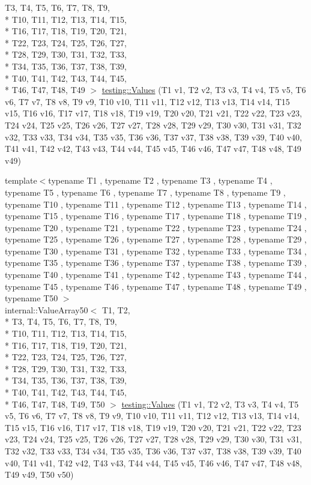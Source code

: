 \begin{DoxyCompactItemize}
T3, T4, T5, T6, T7, T8, T9, \\*
T10, T11, T12, T13, T14, T15, \\*
T16, T17, T18, T19, T20, T21, \\*
T22, T23, T24, T25, T26, T27, \\*
T28, T29, T30, T31, T32, T33, \\*
T34, T35, T36, T37, T38, T39, \\*
T40, T41, T42, T43, T44, T45, \\*
T46, T47, T48, T49 $>$ \hyperlink{namespacetesting_a034785cd0f04e5f5ec9e16c1cad5ccde}{testing\-::\-Values} (T1 v1, T2 v2, T3 v3, T4 v4, T5 v5, T6 v6, T7 v7, T8 v8, T9 v9, T10 v10, T11 v11, T12 v12, T13 v13, T14 v14, T15 v15, T16 v16, T17 v17, T18 v18, T19 v19, T20 v20, T21 v21, T22 v22, T23 v23, T24 v24, T25 v25, T26 v26, T27 v27, T28 v28, T29 v29, T30 v30, T31 v31, T32 v32, T33 v33, T34 v34, T35 v35, T36 v36, T37 v37, T38 v38, T39 v39, T40 v40, T41 v41, T42 v42, T43 v43, T44 v44, T45 v45, T46 v46, T47 v47, T48 v48, T49 v49)
\item 
{\footnotesize template$<$typename T1 , typename T2 , typename T3 , typename T4 , typename T5 , typename T6 , typename T7 , typename T8 , typename T9 , typename T10 , typename T11 , typename T12 , typename T13 , typename T14 , typename T15 , typename T16 , typename T17 , typename T18 , typename T19 , typename T20 , typename T21 , typename T22 , typename T23 , typename T24 , typename T25 , typename T26 , typename T27 , typename T28 , typename T29 , typename T30 , typename T31 , typename T32 , typename T33 , typename T34 , typename T35 , typename T36 , typename T37 , typename T38 , typename T39 , typename T40 , typename T41 , typename T42 , typename T43 , typename T44 , typename T45 , typename T46 , typename T47 , typename T48 , typename T49 , typename T50 $>$ }\\internal\-::\-Value\-Array50$<$ T1, T2, \\*
T3, T4, T5, T6, T7, T8, T9, \\*
T10, T11, T12, T13, T14, T15, \\*
T16, T17, T18, T19, T20, T21, \\*
T22, T23, T24, T25, T26, T27, \\*
T28, T29, T30, T31, T32, T33, \\*
T34, T35, T36, T37, T38, T39, \\*
T40, T41, T42, T43, T44, T45, \\*
T46, T47, T48, T49, T50 $>$ \hyperlink{namespacetesting_a7b6008393a1fa7b55b07fbad67c1c811}{testing\-::\-Values} (T1 v1, T2 v2, T3 v3, T4 v4, T5 v5, T6 v6, T7 v7, T8 v8, T9 v9, T10 v10, T11 v11, T12 v12, T13 v13, T14 v14, T15 v15, T16 v16, T17 v17, T18 v18, T19 v19, T20 v20, T21 v21, T22 v22, T23 v23, T24 v24, T25 v25, T26 v26, T27 v27, T28 v28, T29 v29, T30 v30, T31 v31, T32 v32, T33 v33, T34 v34, T35 v35, T36 v36, T37 v37, T38 v38, T39 v39, T40 v40, T41 v41, T42 v42, T43 v43, T44 v44, T45 v45, T46 v46, T47 v47, T48 v48, T49 v49, T50 v50)

\end{DoxyCompactItemize}
